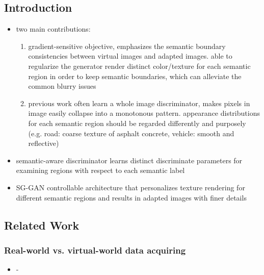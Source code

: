 \subsection{Introduction}
\begin{itemize}
	\item two main contributions: 
	\begin{enumerate}
		\item gradient-sensitive objective, emphasizes the semantic boundary consistencies between virtual images and adapted images. able to regularize the generator render distinct color/texture for each semantic region in order to keep semantic boundaries, which can alleviate the common blurry issues
		\item previous work often learn a whole image discriminator, makes pixels in image easily collapse into a monotonous pattern. appearance distributions for each semantic region should be regarded differently and purposely (e.g. road: coarse texture of asphalt concrete, vehicle: smooth and reflective)
	\end{enumerate}
	\item semantic-aware discriminator learns distinct discriminate parameters for examining regions with respect to each semantic label
	\item SG-GAN controllable architecture that personalizes texture rendering for different semantic regions and results in adapted images with finer details
\end{itemize}

\subsection{Related Work}
\subsubsection{Real-world vs. virtual-world data acquiring}
\begin{itemize}
	\item -
\end{itemize}
